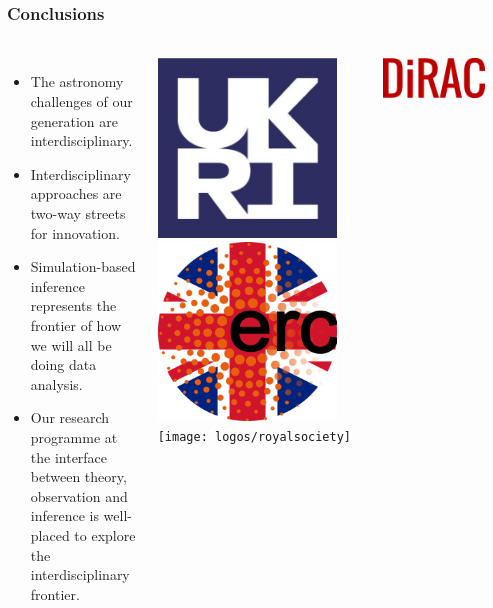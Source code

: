 \documentclass[aspectratio=169]{beamer}
\begin{document}
\begin{frame}
    \frametitle{Conclusions}
    \framesubtitle{}
    \begin{columns}
        \begin{itemize}
            \item The astronomy challenges of our generation are interdisciplinary.
            \item Interdisciplinary approaches are two-way streets for innovation.
            \item Simulation-based inference represents the frontier of how we will all be doing data analysis.
            \item Our research programme at the interface between theory, observation and inference is well-placed to explore the interdisciplinary frontier.
        \end{itemize}

        \includegraphics[height=0.32\textwidth]{logos/ukri}\hfill
        \includegraphics[height=0.32\textwidth]{logos/ukerc}\hfill
        \texttt{[image: logos/royalsociety]}

        \centerline{
            \includegraphics[width=0.8\textwidth]{logos/dirac.png}%
        }
    \end{columns}
    \vspace{10pt}



\end{frame}
\end{document}
